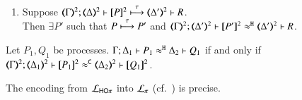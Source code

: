 \documentclass[runningheads]{llncs}
\begin{document}
{\begin{proposition}
\begin{enumerate}[1.]
\begin{enumerate}[a)]
\begin{enumerate}[-]
					\item	%
						$
						\horel{\tmap{\Gamma}{2}}{\tmap{\Delta}{2}}{\pmap{P}{2}}
						{\hby{\tau}}
						{\tmap{\Delta'}{2}}{}{\newsp{\tilde{m}}{\pmap{P_1}{2} \Par \newsp{s}
						{\pmap{P_2}{2}\subst{\dual{s}}{x} \!\Par\! \binp{s}{y} \binp{y}{x} \pmap{Q}{2}}}}
						$, for some  $P_1, P_2, Q$;

					\item	%
						$\horel{\tmap{\Gamma}{2}}{\tmap{\Delta}{2}}{\pmap{P}{2}}
						{\hby{\tau}}
						{\tmap{\Delta'}{2}}{}{{\pmap{P'}{2} }}
						$

				\end{enumerate}
				\item 	If $\ell = \btau$ then 
						$\horel{\tmap{\Gamma}{2}}{\tmap{\Delta}{2}}{\pmap{P}{2}}
						{\hby{\stau}}
						{\tmap{\Delta'}{2}}{}{{\pmap{P'}{2} }}
						$.
				\end{enumerate}
		
		\item Suppose 
		$\stytra{\mapt{\Gamma}^{2}}{\tau}{\mapt{\Delta}^{2}}{\map{P}^{2}}{\mapt{\Delta'}^{2}}{R}$.  \\
		Then $\exists P'$ such that
					$P \stackrel{\tau}{\longmapsto} P'$
					and $\horel{\mapt{\Gamma}^{2}}{\mapt{\Delta'}^{2}}{\map{P'}^{2}}{\hwb}{\mapt{\Delta'}^{2}}{R}$.
	\end{enumerate}
\end{proposition}


\begin{proposition}%
	\label{prop:fulla_HOp_to_p}
	Let $P_1, Q_1$ be \HOp processes.
	$\Gamma; \Delta_1 \vdash P_1 \approx^\mathtt{H} \Delta_2 \vdash Q_1$
	if and only if
	$\horel{\tmap{\Gamma}{2}}{\tmap{\Delta_1}{2}}{\pmap{P_1}{2}}{\fwb}{\tmap{\Delta_2}{2}}{\pmap{Q_1}{2}}$.
\end{proposition}




\begin{theorem}
\label{f:enc:hotopi}
The encoding from $\mathcal{L}_{\mathsf{HO}\pi}$ into $\mathcal{L}_{\pi}$ (cf.~)
is precise. 
\end{theorem}

}
\end{document}
